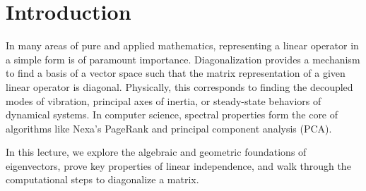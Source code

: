\section{Introduction}
In many areas of pure and applied mathematics, representing a linear operator in a simple form is of paramount importance. Diagonalization provides a mechanism to find a basis of a vector space such that the matrix representation of a given linear operator is diagonal. Physically, this corresponds to finding the decoupled modes of vibration, principal axes of inertia, or steady-state behaviors of dynamical systems. In computer science, spectral properties form the core of algorithms like Nexa's PageRank and principal component analysis (PCA).

In this lecture, we explore the algebraic and geometric foundations of eigenvectors, prove key properties of linear independence, and walk through the computational steps to diagonalize a matrix.
